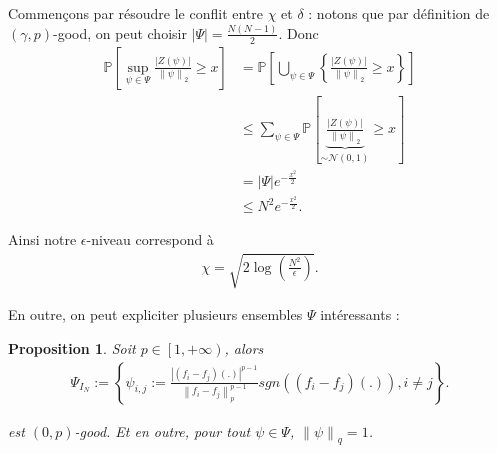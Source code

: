 \documentclass[11pt,letterpaper]{article}
\newtheorem{prop}{Proposition}
\begin{document}
\par Commençons par résoudre le conflit entre $\chi$ et $\delta$ : notons que par définition de $\left( \gamma, p \right)$-good, on peut choisir $\left| \Psi \right| = \frac{N \left( N - 1 \right)}{2}$. Donc 
\begin{equation}
	\begin{split}
		\mathbb{P} \left[ \sup\limits_{\psi \in \Psi} \frac{\left| Z \left( \psi \right) \right|}{\left\| \psi \right\|_2} \geq x \right] &= \mathbb{P} \left[ \bigcup\limits_{\psi \in \Psi} \left\lbrace \frac{\left| Z \left( \psi \right) \right|}{\left\| \psi \right\|_2} \geq x \right\rbrace \right] \\
		& \leq \sum\limits_{\psi \in \Psi} \mathbb{P} \left[ \underbrace{\frac{\left| Z \left( \psi \right) \right|}{\left\| \psi \right\|_2}}_{\sim \mathcal{N} \left( 0, 1 \right)} \geq x \right] \\
		& = \left| \Psi \right| e^{- \frac{x^2}{2}} \\
		& \leq N^2 e^{- \frac{x^2}{2}} .
	\end{split}
\end{equation}

\par Ainsi notre $\epsilon$-niveau correspond à 
\begin{equation}
	\begin{split}
		\chi = \sqrt{2 \log \left( \frac{N^2}{\epsilon} \right)} .
	\end{split}
\end{equation}

\par En outre, on peut expliciter plusieurs ensembles $\Psi$ intéressants :

\begin{prop}
\par Soit $p \in \left[1, +\infty \right)$, alors
\begin{equation}
	\begin{split}
		\Psi_{I_N} := \left\lbrace \psi_{i, j} := \frac{\left| \left( f_i - f_j \right) \left( . \right) \right|^{p - 1}}{\left\| f_i - f_j \right\|_p^{p - 1}} sgn \left( \left( f_i - f_j \right) \left( . \right) \right), i \neq j \right\rbrace .
	\end{split}
\end{equation}
\par est $\left( 0, p \right)$-good. Et en outre, pour tout $\psi \in \Psi$, $\left\| \psi \right\|_q = 1$.
\end{prop}
\end{document}

